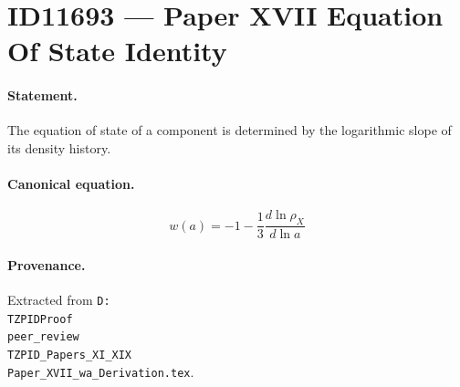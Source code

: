 \section*{ID11693 --- Paper XVII Equation Of State Identity}

\paragraph{Statement.}
The equation of state of a component is determined by the logarithmic slope of its density history.

\paragraph{Canonical equation.}
\[
w(a)=-1-\frac{1}{3}\frac{d\ln\rho_X}{d\ln a}
\]

\paragraph{Provenance.}
Extracted from \texttt{D:\\TZPIDProof\\peer\_review\\TZPID\_Papers\_XI\_XIX\\Paper\_XVII\_wa\_Derivation.tex}.
